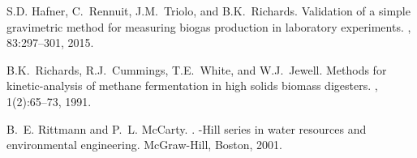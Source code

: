 \documentclass{article}
\begin{document}
 
 
 
 
  
\begin{thebibliography}{1}

S.D. Hafner, C.~Rennuit, J.M.~Triolo, and B.K.~Richards.
\newblock Validation of a simple gravimetric method for measuring biogas
  production in laboratory experiments.
, 83:297--301, 2015.

B.K.~Richards, R.J.~Cummings, T.E.~White, and W.J.~Jewell.
\newblock Methods for kinetic-analysis of methane fermentation in high solids
  biomass digesters.
, 1(2):65--73, 1991.

B.~E. Rittmann and P.~L. McCarty.
.
-{Hill} series in water resources and environmental
  engineering. McGraw-Hill, Boston, 2001.

\end{thebibliography}
\end{document}
